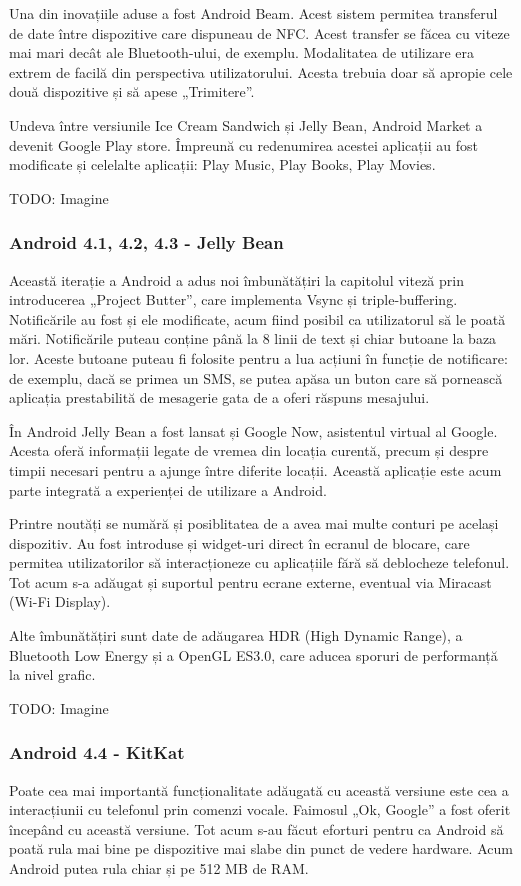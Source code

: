 \documentclass[12pt,a4paper]{article}
\begin{document}
	Una din inovațiile aduse a fost Android Beam. Acest sistem permitea transferul de date între dispozitive care dispuneau de NFC. Acest transfer se făcea cu viteze mai mari decât ale Bluetooth-ului, de exemplu. Modalitatea de utilizare era extrem de facilă din perspectiva utilizatorului. Acesta trebuia doar să apropie cele două dispozitive și să apese „Trimitere”.

	Undeva între versiunile Ice Cream Sandwich și Jelly Bean, Android Market a devenit Google Play store. Împreună cu redenumirea acestei aplicații au fost modificate și celelalte aplicații: Play Music, Play Books, Play Movies.

	TODO: Imagine

\subsubsection{Android 4.1, 4.2, 4.3 - Jelly Bean}
Această iterație a Android a adus noi îmbunătățiri la capitolul viteză prin introducerea „Project Butter”, care implementa Vsync și triple-buffering. Notificările au fost și ele modificate, acum fiind posibil ca utilizatorul să le poată mări. Notificările puteau conține până la 8 linii de text și chiar butoane la baza lor. Aceste butoane puteau fi folosite pentru a lua acțiuni în funcție de notificare: de exemplu, dacă se primea un SMS, se putea apăsa un buton care să pornească aplicația prestabilită de mesagerie gata de a oferi răspuns mesajului.

	În Android Jelly Bean a fost lansat și Google Now, asistentul virtual al Google. Acesta oferă informații legate de vremea din locația curentă, precum și despre timpii necesari pentru a ajunge între diferite locații. Această aplicație este acum parte integrată a experienței de utilizare a Android.

	Printre noutăți se numără și posiblitatea de a avea mai multe conturi pe același dispozitiv. Au fost introduse și widget-uri direct în ecranul de blocare, care permitea utilizatorilor să interacționeze cu aplicațiile fără să deblocheze telefonul. Tot acum s-a adăugat și suportul pentru ecrane externe, eventual via Miracast (Wi-Fi Display).

	Alte îmbunătățiri sunt date de adăugarea HDR (High Dynamic Range), a Bluetooth Low Energy și a OpenGL ES3.0, care aducea sporuri de performanță la nivel grafic.

	TODO: Imagine

\subsubsection{Android 4.4 - KitKat}
Poate cea mai importantă funcționalitate adăugată cu această versiune este cea a interacțiunii cu telefonul prin comenzi vocale. Faimosul „Ok, Google” a fost oferit începând cu această versiune. Tot acum s-au făcut eforturi pentru ca Android să poată rula mai bine pe dispozitive mai slabe din punct de vedere hardware. Acum Android putea rula chiar și pe 512 MB de RAM.
\end{document}
